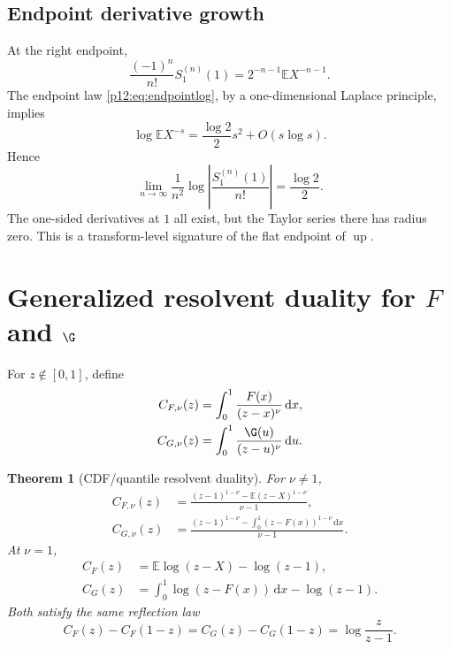 \documentclass[11pt,oneside]{article}
\newtheorem{theorem}{Theorem}[section]
\theoremstyle{definition}
\theoremstyle{remark}
\newcommand{\F}{F}
\newcommand{\Up}{\operatorname{up}}
\newcommand{\E}{\mathbb E}
\newcommand{\dd}{\,\mathrm d}
\newcommand{\1}{\mathbf 1}
\begin{document}
\subsection{Endpoint derivative growth}

At the right endpoint,
\begin{equation}\label{p12:eq:Sendpointderiv}
 \frac{(-1)^n}{n!}S_1^{(n)}(1)
 =2^{-n-1}\E X^{-n-1}.
\end{equation}
The endpoint law \eqref{p12:eq:endpointlog}, by a one-dimensional Laplace principle,
implies
\begin{equation}\label{p12:eq:negmomentgrowth}
 \log\E X^{-s}=\frac{\log2}{2}s^2+O(s\log s).
\end{equation}
Hence
\begin{equation}\label{p12:eq:Sdergrowth}
 \boxed{
 \lim_{n\to\infty}\frac1{n^2}
 \log\left|\frac{S_1^{(n)}(1)}{n!}\right|
 =\frac{\log2}{2}.}
\end{equation}
The one-sided derivatives at \(1\) all exist, but the Taylor series there has
radius zero.  This is a transform-level signature of the flat endpoint of
\(\Up\).

\section{Generalized resolvent duality for \(\F\) and \(\G\)}

For \(z\notin[0,1]\), define
\begin{align}
 C_{F,\nu}(z)&=\int_0^1\frac{\F(x)}{(z-x)^\nu}\dd x,\label{p12:eq:CFnu}\\
 C_{G,\nu}(z)&=\int_0^1\frac{\G(u)}{(z-u)^\nu}\dd u.\label{p12:eq:CGnu}
\end{align}

\begin{theorem}[CDF/quantile resolvent duality\tagnew]\label{p12:thm:resdual}
For \(\nu\ne1\),
\begin{align}
 C_{F,\nu}(z)
 &=\frac{(z-1)^{1-\nu}-\E(z-X)^{1-\nu}}{\nu-1},\label{p12:eq:CFdual}\\
 C_{G,\nu}(z)
 &=\frac{(z-1)^{1-\nu}
 -\displaystyle\int_0^1(z-\F(x))^{1-\nu}\dd x}{\nu-1}.
 \label{p12:eq:CGdual}
\end{align}
At \(\nu=1\),
\begin{align}
 C_F(z)&=\E\log(z-X)-\log(z-1),\label{p12:eq:CFlog}\\
 C_G(z)&=\int_0^1\log(z-\F(x))\dd x-\log(z-1).
 \label{p12:eq:CGlog}
\end{align}
Both satisfy the same reflection law
\begin{equation}\label{p12:eq:Creflection}
 C_F(z)-C_F(1-z)=C_G(z)-C_G(1-z)
 =\log\frac z{z-1}.
\end{equation}
\end{theorem}
\end{document}
